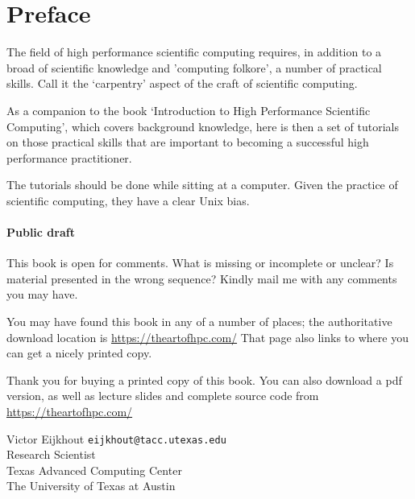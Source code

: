 
\thispagestyle{empty}
\section*{Preface}

The field of high performance scientific computing
requires, in addition to a broad of scientific knowledge and 'computing
folkore', a number of practical skills. Call it the `carpentry' aspect
of the craft of scientific computing.

As a companion to the book `Introduction to High Performance
Scientific Computing', which covers background knowledge, here is then
a set of tutorials on those practical skills that are important to
becoming a successful high performance practitioner.

The tutorials
should be done while sitting at a computer. Given the practice of
scientific computing, they have a clear Unix bias.

\begin{notlulu}
\paragraph*{\bf Public draft}

This book is 
open for comments.
What is missing or incomplete or unclear? Is material
presented in the wrong sequence? Kindly mail me with any comments you
may have.
\end{notlulu}

\begin{download}
You may have found this book in any of a number of places; the
authoritative download location is 
\url{https://theartofhpc.com/}
That page also links to  where you can get a nicely printed copy.
\end{download}
\begin{lulu}
Thank you for buying a printed copy of this book. 
You can also download a pdf 
version, as well as lecture slides and complete source code from
\url{https://theartofhpc.com/}
\end{lulu}

\bigskip
\noindent
Victor Eijkhout {\tt eijkhout@tacc.utexas.edu}\\
Research Scientist\\
Texas Advanced Computing Center\\
The University of Texas at Austin

